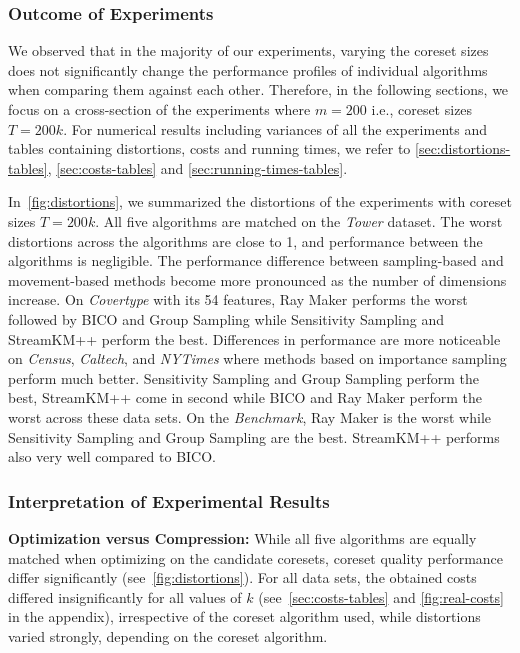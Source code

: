 \subsubsection*{Outcome of Experiments}
We observed that in the majority of our experiments, varying the coreset sizes does not significantly change the performance profiles of individual algorithms when comparing them against each other. Therefore, in the following sections, we focus on a cross-section of the experiments where $m=200$ i.e., coreset sizes $T=200k$.
For numerical results including variances of all the experiments and tables containing distortions, costs and running times, we refer to \cref{sec:distortions-tables}, \cref{sec:costs-tables} and \cref{sec:running-times-tables}. 

In~\cref{fig:distortions}, we summarized the distortions of the experiments with coreset sizes $T=200k$. All five algorithms are matched on the \textit{Tower} dataset. The worst distortions across the algorithms are close to 1, and performance between the algorithms is negligible. The performance difference between sampling-based and movement-based methods become more pronounced as the number of dimensions increase. On \textit{Covertype} with its 54 features, Ray Maker performs the worst followed by BICO and Group Sampling while Sensitivity Sampling and StreamKM++ perform the best. Differences in performance are more noticeable on \textit{Census}, \textit{Caltech}, and \textit{NYTimes}  where methods based on importance sampling perform much better. Sensitivity Sampling and Group Sampling perform the best, StreamKM++ come in second while BICO and Ray Maker perform the worst across these data sets.
On the \textit{Benchmark}, Ray Maker is the worst while Sensitivity Sampling and Group Sampling are the best. StreamKM++ performs also very well compared to BICO.


\subsubsection*{Interpretation of Experimental Results}



{\bf Optimization versus Compression:}
While all five algorithms are equally matched when optimizing on the candidate coresets, coreset quality performance differ significantly (see~\cref{fig:distortions}). 
For all data sets, the obtained costs differed insignificantly for all values of $k$ (see~\cref{sec:costs-tables} and \cref{fig:real-costs} in the appendix), irrespective of the coreset algorithm used, while distortions varied strongly, depending on the coreset algorithm.


